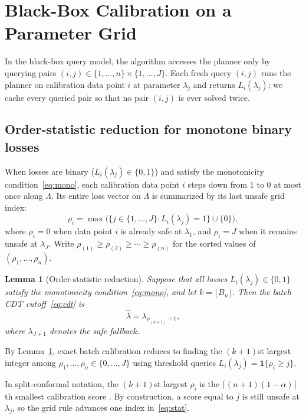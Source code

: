 \documentclass[a4paper,10pt]{article}
\theoremstyle{plain}
\newtheorem{lemma}[theorem]{Lemma}
\theoremstyle{remark}
\begin{document}
\section{Black-Box Calibration on a Parameter Grid}\label{sec:blackbox}

In the black-box query model, the algorithm accesses the planner only by querying pairs $(i,j)\in\{1,\ldots,n\}\times\{1,\ldots,J\}$. Each fresh query $(i,j)$ runs the planner on calibration data point $i$ at parameter $\lambda_j$ and returns $L_i(\lambda_j)$; we cache every queried pair so that no pair $(i,j)$ is ever solved twice.

\subsection{Order-statistic reduction for monotone binary losses}\label{sec:order-stat}

When losses are binary ($L_i(\lambda_j)\in\{0,1\}$) and satisfy the monotonicity condition~\eqref{eq:mono}, each calibration data point $i$ steps down from $1$ to $0$ at most once along $\Lambda$. Its entire loss vector on $\Lambda$ is summarized by its last unsafe grid index:
\begin{equation}\label{eq:rho}
 \rho_i=\max\bigl(\{j\in\{1,\ldots,J\}:L_i(\lambda_j)=1\}\cup\{0\}\bigr),
\end{equation}
where $\rho_i=0$ when data point $i$ is already safe at $\lambda_1$, and $\rho_i=J$ when it remains unsafe at $\lambda_J$. Write $\rho_{(1)}\ge\rho_{(2)}\ge\cdots\ge\rho_{(n)}$ for the sorted values of $(\rho_1,\ldots,\rho_n)$.

\begin{lemma}[Order-statistic reduction]\label{lem:order}
Suppose that all losses $L_i(\lambda_j)\in\{0,1\}$ satisfy the monotonicity condition~\eqref{eq:mono}, and let $k=\lfloor B_n\rfloor$. Then the batch CDT cutoff~\eqref{eq:cdt} is
\begin{equation}\label{eq:stat}
 \widehat\lambda=\lambda_{\rho_{(k+1)}+1},
\end{equation}
where $\lambda_{J+1}$ denotes the safe fallback.
\end{lemma}

By Lemma~\ref{lem:order}, exact batch calibration reduces to finding the $(k+1)$st largest integer among $\rho_1,\ldots,\rho_n\in\{0,\ldots,J\}$ using threshold queries $L_i(\lambda_j)=\mathbf1\{\rho_i\ge j\}$.

In split-conformal notation, the $(k+1)$st largest $\rho_i$ is the $\lceil(n+1)(1-\alpha)\rceil$th smallest calibration score \cite{crc}. By construction, a score equal to $j$ is still unsafe at $\lambda_j$, so the grid rule advances one index in~\eqref{eq:stat}.
\end{document}
